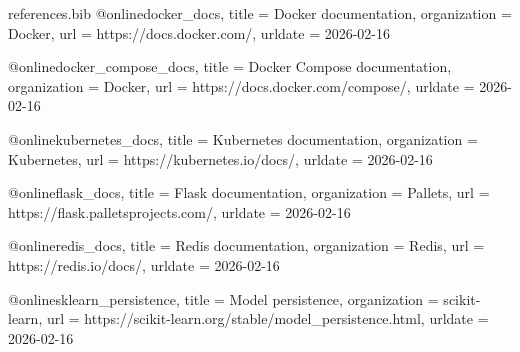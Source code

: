 
\begin{filecontents*}{references.bib}
@online{docker_docs,
  title        = {Docker documentation},
  organization = {Docker},
  url          = {https://docs.docker.com/},
  urldate      = {2026-02-16}
}

@online{docker_compose_docs,
  title        = {Docker Compose documentation},
  organization = {Docker},
  url          = {https://docs.docker.com/compose/},
  urldate      = {2026-02-16}
}

@online{kubernetes_docs,
  title        = {Kubernetes documentation},
  organization = {Kubernetes},
  url          = {https://kubernetes.io/docs/},
  urldate      = {2026-02-16}
}

@online{flask_docs,
  title        = {Flask documentation},
  organization = {Pallets},
  url          = {https://flask.palletsprojects.com/},
  urldate      = {2026-02-16}
}

@online{redis_docs,
  title        = {Redis documentation},
  organization = {Redis},
  url          = {https://redis.io/docs/},
  urldate      = {2026-02-16}
}

@online{sklearn_persistence,
  title        = {Model persistence},
  organization = {scikit-learn},
  url          = {https://scikit-learn.org/stable/model_persistence.html},
  urldate      = {2026-02-16}
}
\end{filecontents*}

\documentclass[11pt]{amsart}

\usepackage[headheight=65pt]{geometry}
\geometry{
  top=1 in,
  inner=1 in,
  outer=1 in,
  bottom=1 in,
  headheight=3ex,
  headsep=2ex,
}

\def \fname{Jason}
\def \lname{Stys}
\def \partner{Partner Name}
\def \class{CS 446-01}
\def \assgn{Assignment 4}

\usepackage{fancyhdr}
\pagestyle{fancy}
\lhead{\fname\ \lname}
\fancyfoot{}
\chead{\assgn}
\renewcommand{\headrulewidth}{2pt}

\usepackage{amssymb,amsmath,amsthm,amscd,mathrsfs,graphicx,color}
\usepackage[active]{srcltx}
\usepackage{mathpazo}
\usepackage{setspace}\doublespacing
\usepackage{hyperref}
\usepackage[usenames,dvipsnames]{xcolor}
\usepackage[style=science,sortcites=true,sorting=nyt,backend=biber]{biblatex}
\hypersetup{colorlinks=true,citecolor=ForestGreen,linkcolor=Maroon,urlcolor=NavyBlue}

